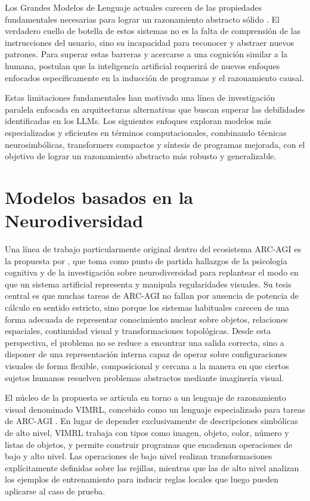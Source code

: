 \documentclass[11pt,a4paper,spanish]{book}
\numberwithin{equation}{chapter}
\numberwithin{figure}{chapter}
\begin{document}
Los Grandes Modelos de Lenguaje  actuales carecen de las propiedades fundamentales necesarias para lograr un 
razonamiento abstracto sólido \cite{gendron2024largelanguagemodelsstrong}. El verdadero cuello de botella de estos sistemas no es la falta de comprensión de las instrucciones del usuario, 
sino su incapacidad para reconocer y abstraer nuevos patrones. Para superar estas barreras y acercarse a una cognición similar a la humana,  
postulan que la inteligencia
artificial requerirá de nuevos enfoques enfocados específicamente en la inducción de programas y el razonamiento causal.

Estas limitaciones fundamentales han motivado una línea de investigación paralela enfocada en arquitecturas alternativas que buscan superar las 
debilidades identificadas en los LLMs. Los siguientes enfoques exploran modelos más especializados y eficientes en términos computacionales, 
combinando técnicas neurosimbólicas, transformers compactos y síntesis de programas mejorada, con el objetivo de lograr un razonamiento abstracto más robusto y generalizable.

\section{Modelos basados en la Neurodiversidad}

Una línea de trabajo particularmente original dentro del ecosistema ARC-AGI es la propuesta por , que toma como punto de 
partida hallazgos de la psicología cognitiva y de la investigación sobre neurodiversidad para replantear el modo en que un sistema artificial representa y 
manipula regularidades visuales. Su tesis central es que muchas tareas de ARC-AGI no fallan por ausencia de potencia de cálculo en sentido estricto, sino porque 
los sistemas habituales carecen de una forma adecuada de representar conocimiento nuclear sobre objetos, relaciones espaciales, continuidad visual y 
transformaciones topológicas. Desde esta perspectiva, el problema no se reduce a encontrar una salida correcta, sino a disponer de una representación interna 
capaz de operar sobre configuraciones visuales de forma flexible, composicional y cercana a la manera en que ciertos sujetos humanos resuelven problemas 
abstractos mediante imaginería visual.

El núcleo de la propuesta se articula en torno a un lenguaje de razonamiento visual denominado VIMRL, concebido como un lenguaje especializado 
para tareas de ARC-AGI \cite{ainooson2023neurodiversity}. En lugar de depender exclusivamente de descripciones simbólicas de alto nivel, VIMRL trabaja con tipos 
como imagen, objeto, color, número y listas de objetos, y permite construir programas que encadenan operaciones de bajo y alto nivel. Las operaciones de bajo 
nivel realizan transformaciones explícitamente definidas sobre las rejillas, mientras que las de alto nivel analizan los ejemplos de entrenamiento para 
inducir reglas locales que luego pueden aplicarse al caso de prueba.
\end{document}
